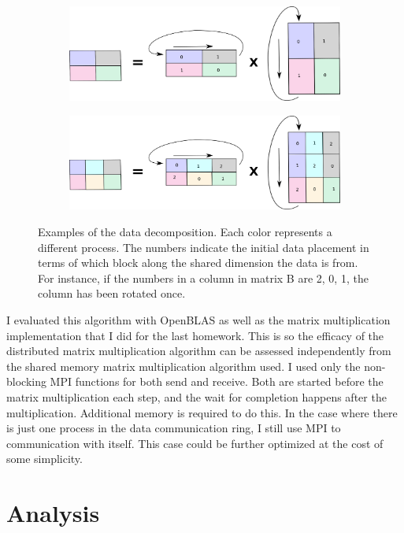 \documentclass{article}
\begin{document}
\begin{figure}
\begin{subfigure}{.9\textwidth}
  \centering
  \includegraphics[width=.9\linewidth]{figures/fig_2_2.png}
\end{subfigure}
\begin{subfigure}{.9\textwidth}
  \centering
  \includegraphics[width=.9\linewidth]{figures/fig_2_3.png}
\end{subfigure}
\caption{Examples of the data decomposition. Each color represents a different process. 
The numbers indicate the initial data placement in terms of which block along the shared dimension
the data is from. For instance, if the numbers in a column in matrix B are 2, 0, 1, the column has 
been rotated once.}
\label{fig:fig}
\end{figure}

I evaluated this algorithm with OpenBLAS as well as the matrix multiplication implementation that I did for 
the last homework. This is so the efficacy of the distributed matrix multiplication algorithm can
be assessed independently from the shared memory matrix multiplication algorithm used. I used only the
non-blocking MPI functions for both send and receive. Both are started before the matrix multiplication
each step, and the wait for completion happens after the multiplication. Additional memory
is required to do this. In the case where there is just one process in the data communication ring,
I still use MPI to communication with itself. This case could be further optimized at the cost of some
simplicity.

\section{Analysis}
\end{document}

